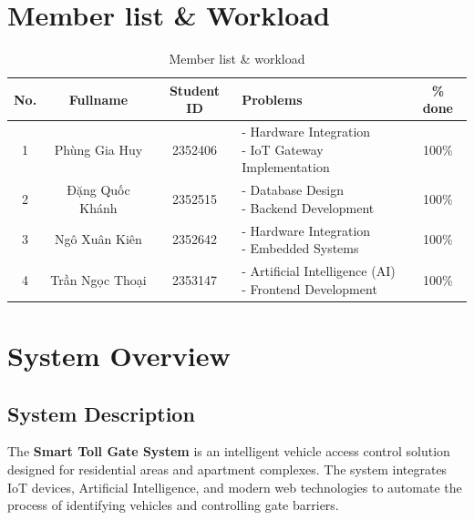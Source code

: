 \documentclass[a4paper]{article}
\begin{document}
\pagebreak
\tableofcontents
\pagebreak

\section*{Member list \& Workload}
\begin{center}
\begin{table}[h]
\centering
\renewcommand{\arraystretch}{1.5}
\begin{tabular}{|c|c|c|p{7cm}|c|}
\hline
\textbf{No.} & \textbf{Fullname} & \textbf{Student ID} & \textbf{Problems} & \textbf{\% done}\\
\hline
1 & Phùng Gia Huy & 2352406 & \makecell[l]{- Hardware Integration \\ - IoT Gateway Implementation} & 100\%\\
\hline
2 & Đặng Quốc Khánh & 2352515 & \makecell[l]{- Database Design \\ - Backend Development} & 100\%\\
\hline
3 & Ngô Xuân Kiên & 2352642 & \makecell[l]{- Hardware Integration \\ - Embedded Systems} & 100\%\\
\hline
4 & Trần Ngọc Thoại & 2353147 & \makecell[l]{- Artificial Intelligence (AI) \\ - Frontend Development} & 100\%\\
\hline
\end{tabular}
\caption{\label{table1}Member list \& workload}
\end{table}
\end{center}

\pagebreak
\setlength{\parindent}{0pt}

\section{System Overview}

\subsection{System Description}
The \textbf{Smart Toll Gate System} is an intelligent vehicle access control solution designed for residential areas and apartment complexes. The system integrates IoT devices, Artificial Intelligence, and modern web technologies to automate the process of identifying vehicles and controlling gate barriers.
\end{document}

